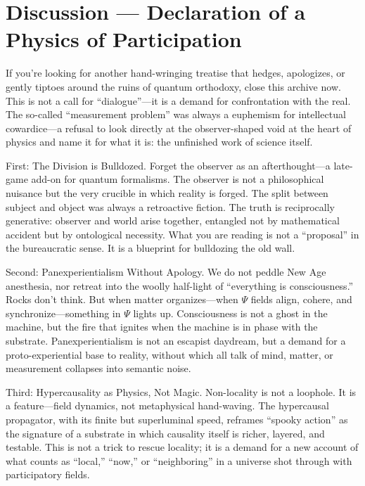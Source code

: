 \documentclass[11pt, a4paper]{book}
\begin{document}
\section{Discussion — Declaration of a Physics of Participation} %
\label{sec:discussion_mainpaper_actual} %
If you’re looking for another hand-wringing treatise that hedges, apologizes, or gently tiptoes around the ruins of quantum orthodoxy, close this archive now. This is not a call for “dialogue”—it is a demand for confrontation with the real. The so-called “measurement problem” was always a euphemism for intellectual cowardice—a refusal to look directly at the observer-shaped void at the heart of physics and name it for what it is: the unfinished work of science itself.

First: The Division is Bulldozed.
Forget the observer as an afterthought—a late-game add-on for quantum formalisms. The observer is not a philosophical nuisance but the very crucible in which reality is forged. The split between subject and object was always a retroactive fiction. The truth is reciprocally generative: observer and world arise together, entangled not by mathematical accident but by ontological necessity. What you are reading is not a “proposal” in the bureaucratic sense. It is a blueprint for bulldozing the old wall.

Second: Panexperientialism Without Apology.
We do not peddle New Age anesthesia, nor retreat into the woolly half-light of “everything is consciousness.” Rocks don’t think. But when matter organizes—when $\Psi$ fields align, cohere, and synchronize—something in $\Psi$ lights up. Consciousness is not a ghost in the machine, but the fire that ignites when the machine is in phase with the substrate. Panexperientialism is not an escapist daydream, but a demand for a proto-experiential base to reality, without which all talk of mind, matter, or measurement collapses into semantic noise.

Third: Hypercausality as Physics, Not Magic.
Non-locality is not a loophole. It is a feature—field dynamics, not metaphysical hand-waving. The hypercausal propagator, with its finite but superluminal speed, reframes “spooky action” as the signature of a substrate in which causality itself is richer, layered, and testable. This is not a trick to rescue locality; it is a demand for a new account of what counts as “local,” “now,” or “neighboring” in a universe shot through with participatory fields.
\end{document}

